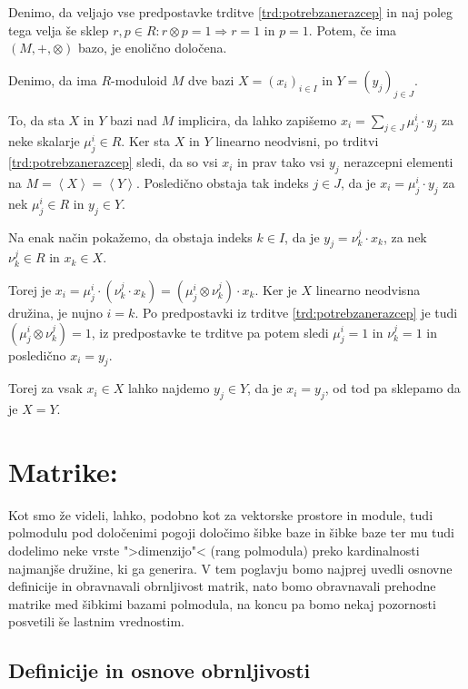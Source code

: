 \documentclass[mat1]{fmfdelo}
\newcommand{\Gen}[1]{\ensuremath{\left<{#1}\right>}}
\begin{document}
\begin{trditev}
	\label{trd:enoličbaza}
	Denimo, da veljajo vse predpostavke trditve \ref{trd:potrebzanerazcep} in naj poleg tega velja še sklep $r, p\in R: r\otimes p = 1\Rightarrow r = 1$ in $p = 1$. Potem, če ima $(M, +, \otimes)$ bazo, je enolično določena.
\end{trditev}

\begin{dokaz}
	Denimo, da ima $R$-moduloid $M$ dve bazi $X=(x_i)_{i\in I}$ in $Y=(y_j)_{j \in J}$. 
	
	To, da sta $X$ in $Y$ bazi nad $M$ implicira, da lahko zapišemo $x_i = \sum_{j\in J}\mu_j^i\cdot y_j$ za neke skalarje $\mu_j^i \in R$.
	Ker sta $X$ in $Y$ linearno neodvisni, po trditvi \ref{trd:potrebzanerazcep} sledi, da so vsi $x_i$ in prav tako vsi $y_j$ nerazcepni elementi na $M = \Gen{X} = \Gen{Y}$. Posledično obstaja tak indeks $j\in J$, da je $x_i = \mu_j^i \cdot y_j$ za nek $\mu_j^i \in R$ in $y_j\in Y$.
	
	Na enak način pokažemo, da obstaja indeks $k\in I$, da je $y_j = \nu_k^j \cdot x_k$, za nek $\nu_k^j \in R$ in $x_k \in X$.

	Torej je $x_i = \mu_j^i \cdot (\nu_k^j \cdot x_k) = (\mu_j^i \otimes \nu_k^j) \cdot x_k$. Ker je $X$ linearno neodvisna družina, je nujno $i = k$. Po predpostavki iz trditve \ref{trd:potrebzanerazcep} je tudi $(\mu_j^i \otimes \nu_k^j) = 1$, iz predpostavke te trditve pa potem sledi $\mu_j^i = 1$ in $\nu_k^j = 1$ in posledično $x_i = y_j$.
	
	Torej za vsak $x_i\in X$ lahko najdemo $y_j\in Y$, da je $x_i = y_j$, od tod pa sklepamo da je $X = Y$.
\end{dokaz}

\section{Matrike:}
Kot smo že videli, lahko, podobno kot za vektorske prostore in module, tudi polmodulu pod določenimi pogoji določimo šibke baze in šibke baze ter mu tudi dodelimo neke vrste ">dimenzijo"< (rang polmodula) preko kardinalnosti najmanjše družine, ki ga generira. V tem poglavju bomo najprej uvedli osnovne definicije in obravnavali obrnljivost matrik, nato bomo obravnavali prehodne matrike med šibkimi bazami polmodula, na koncu pa bomo nekaj pozornosti posvetili še lastnim vrednostim.

\subsection{Definicije in osnove obrnljivosti}\label{subsect:definv}
\end{document}

